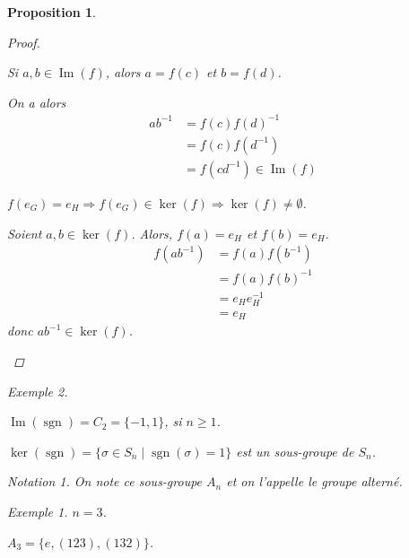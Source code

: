\documentclass{report}
\newcommand*{\gte}{\geqslant}
\newcommand*{\image}{\operatorname{Im}}
\newcommand*{\signe}{\operatorname{sgn}}
\newtheorem*{prop}{Proposition}
\theoremstyle{definition}
\theoremstyle{remark}
\newtheorem*{exem}{Exemple}
\newtheorem*{nota}{Notation}
\begin{document}
\begin{prop}
\begin{proof}
\begin{nlist}
				Si $a,b \in \image(f)$, alors $a=f(c)$ et $b=f(d)$.

				On a alors
				\begin{align*}
					ab^{-1}&= f(c)f(d)^{-1}\\
					&= f(c)f(d^{-1})\\
					&= f(cd^{-1}) \in \image(f)
				\end{align*}
				\item $f(e_G) = e_H \Rightarrow f(e_G) \in \ker(f) \Rightarrow \ker(f) \neq \emptyset$.

				Soient $a,b \in \ker(f)$. Alors, $f(a)=e_H$ et $f(b)=e_H$.
				\begin{align*}
					f(ab^{-1})&= f(a)f(b^{-1})\\
					&= f(a)f(b)^{-1}\\
					&= e_H e_H^{-1}\\
					&= e_H
				\end{align*}
				donc $ab^{-1} \in \ker(f)$.
			\end{nlist}
		\end{proof}
		\begin{exem}~

			$\image(\signe) = C_2 = \{-1,1\}$, si $n \gte 1$.

			$\ker(\signe) = \{\sigma \in S_n \mid \signe(\sigma)=1\}$ est un sous-groupe de $S_n$.
			\begin{nota}
				On note ce sous-groupe $A_n$ et on l'appelle le \emph{groupe altern\'e}.
			\end{nota}
			\begin{exem}
				$n=3$.

				$A_3 = \{e,(123),(132)\}$.
			\end{exem}
		\end{exem}
	\end{prop}
\end{document}
